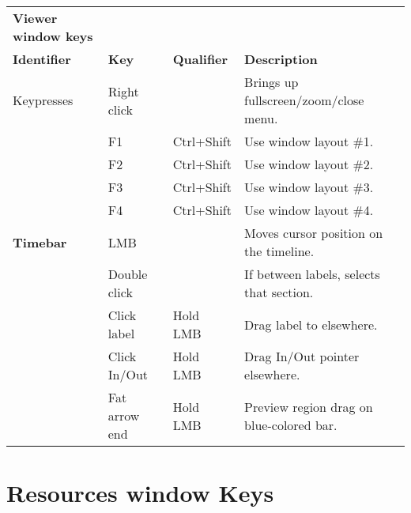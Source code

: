 \begin{longtable}[h]{>{\bfseries}p{}p{}p{}p{}}
  \toprule
  \multicolumn{4}{c}%
  {\textcolor{CinRed}{\textbf{Viewer window keys}}} \\
  Identifier & \textbf{Key} & \textbf{Qualifier} & \textbf{Description}\\
  \midrule
  \endhead

  \textcolor{CinBlueText}{Keypresses} & Right click &  & Brings up fullscreen/zoom/close menu. \\
  & F1 & Ctrl+Shift & Use window layout \#1. \\
  & F2 & Ctrl+Shift & Use window layout \#2. \\
  & F3 & Ctrl+Shift & Use window layout \#3. \\
  & F4 & Ctrl+Shift & Use window layout \#4. \\
  \midrule
  \textcolor{CinBlueText}{Timebar} & LMB &  & Moves cursor position on the timeline. \\
  & Double click &  & If between labels, selects that section. \\
  & Click label & Hold LMB & Drag label to elsewhere. \\
  & Click In/Out & Hold LMB & Drag In/Out pointer elsewhere. \\
  & Fat arrow end & Hold LMB & Preview region drag on blue-colored bar. \\
  \bottomrule
\end{longtable}


\section{Resources window Keys }%
\label{sec:resources_window_keys}

